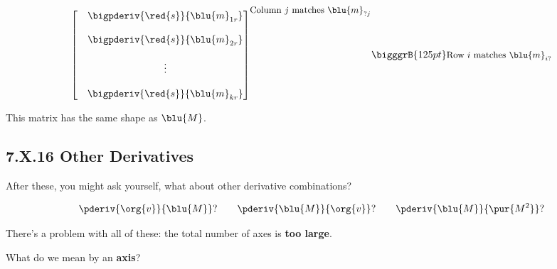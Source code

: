 \begin{definition}
\begin{equation*}
{\begin{bmatrix}
                        &
                        \begin{matrix}
                            \bigpderiv{ \red{s} } { \blu{m}_{1r} }\\ 
                            \\
                            \bigpderiv{ \red{s} } { \blu{m}_{2r} }\\ 
                            \\
                            \vdots \\ 
                            \\
                            \bigpderiv{ \red{s} } { \blu{m}_{kr} }
                        \end{matrix}
                    \end{bmatrix}
                }^{ \text{\small Column $j$ matches $\blu{m}_{?j}$} }
                \bigggrB{125pt} \text{\small Row $i$ matches $\blu{m}_{i?}$} 
            \end{equation*}
            
            This matrix has the same shape as $\blu{M}$.
        \end{definition}
        
        
     \secdiv  
    
    \subsection*{7.X.16 \quad Other Derivatives}
        \label{7.X.16}
    
        After these, you might ask yourself, what about other derivative combinations?
        
        \begin{equation}
            \pderiv{ \org{v} }{ \blu{M} }? 
            \qquad
            \pderiv{ \blu{M} }{ \org{v} }? 
            \qquad
            \pderiv{ \blu{M} }{ \pur{M^2} }? 
        \end{equation}
    
        There's a problem with all of these: the total number of axes is \textbf{too large}.
        
        What do we mean by an \textbf{axis}? \\
        
